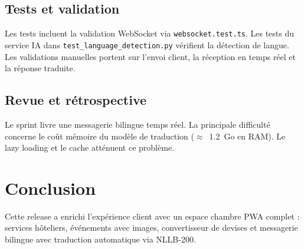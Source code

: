 
\subsection{Tests et validation}
Les tests incluent la validation WebSocket via \texttt{websocket.test.ts}. Les tests du service IA dans \texttt{test\_language\_detection.py} vérifient la détection de langue. Les validations manuelles portent sur l'envoi client, la réception en temps réel et la réponse traduite.

\subsection{Revue et rétrospective}
Le sprint livre une messagerie bilingue temps réel. La principale difficulté concerne le coût mémoire du modèle de traduction ($\approx$~1.2~Go en RAM). Le lazy loading et le cache atténuent ce problème.

\section*{Conclusion}
Cette release a enrichi l'expérience client avec un espace chambre PWA complet : services hôteliers, événements avec images, convertisseur de devises et messagerie bilingue avec traduction automatique via NLLB-200.
